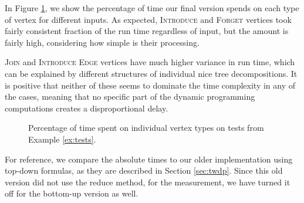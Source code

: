 \documentclass[thesis=M,english,hidelinks]{FITthesis}[2012/10/20]
\theoremstyle{definition}
\begin{document}
In Figure \ref{fig:vertplot}, we show the percentage of time our final version spends on each type of vertex for
different inputs. As expected, \textsc{Introduce} and \textsc{Forget} vertices took fairly consistent fraction of
the run time regardless of input, but the amount is fairly high, considering how simple is their processing.

\textsc{Join} and \textsc{Introduce Edge} vertices have much higher variance in run time, which can be
explained by different structures of individual nice tree decompositions. It is positive that neither of these seems to
dominate the time complexity in any of the cases, meaning that no specific part of the dynamic programming computations
creates a disproportional delay.

\begin{figure}
    \centering
    \caption{Percentage of time spent on individual vertex types on tests from Example \ref{ex:tests}.}
    \label{fig:vertplot}
\end{figure}

For reference, we compare the absolute times to our older implementation using top-down formulas, as they are described
in Section \ref{sec:twdp}. Since this old version did not use the reduce method, for the measurement, we have turned
it off for the bottom-up version as well.
\end{document}
